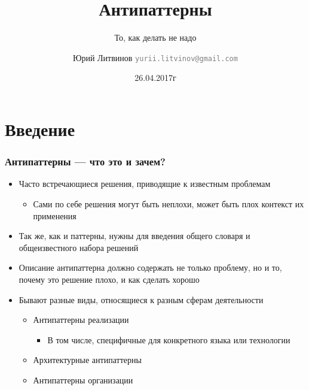 \documentclass[xetex,mathserif,serif]{beamer}
\title{Антипаттерны}
\subtitle{То, как делать не надо}
\author[Юрий Литвинов]{Юрий Литвинов \newline \textcolor{gray}{\small\texttt{yurii.litvinov@gmail.com}}}
\date{26.04.2017г}
\begin{document}
	
	\frame{\titlepage}

	\section{Введение}

	\begin{frame}
		\frametitle{Антипаттерны --- что это и зачем?}
		\begin{itemize}
			\item Часто встречающиеся решения, приводящие к известным проблемам
			\begin{itemize}
				\item Сами по себе решения могут быть неплохи, может быть плох контекст их применения
			\end{itemize}
			\item Так же, как и паттерны, нужны для введения общего словаря и общеизвестного набора решений
			\item Описание антипаттерна должно содержать не только проблему, но и то, почему это решение плохо, и как сделать хорошо
			\item Бывают разные виды, относящиеся к разным сферам деятельности
			\begin{itemize}
				\item Антипаттерны реализации
				\begin{itemize}
					\item В том числе, специфичные для конкретного языка или технологии
				\end{itemize}
				\item Архитектурные антипаттерны
				\item Антипаттерны организации
			\end{itemize}
		\end{itemize}
	\end{frame}
\end{document}
